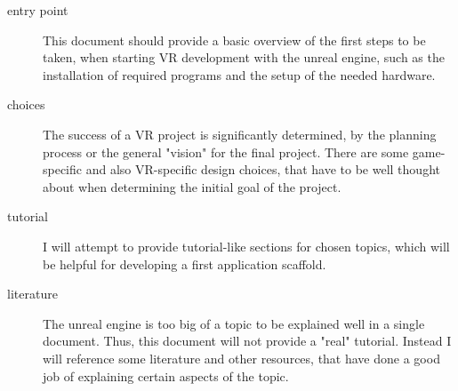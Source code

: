 \begin{description}
\item[entry point] This document should provide a basic overview of the first steps to be taken, when starting VR development with the unreal engine, such as the installation of required programs and the setup of the needed hardware.
\item[choices] The success of a VR project is significantly determined, by the planning process or the general "vision" for the final project. There are some game-specific and also VR-specific design choices, that have to be well thought about when determining the initial goal of the project.
\item[tutorial] I will attempt to provide tutorial-like sections for chosen topics, which will be helpful for developing a first application scaffold.
\item[literature] The unreal engine is too big of a topic to be explained well in a single document. Thus, this document will not provide a "real" tutorial. Instead I will reference some literature and other resources, that have done a good job of explaining certain aspects of the topic.
\end{description}

